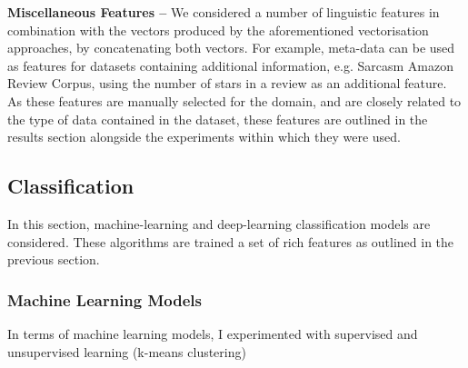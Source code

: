 \documentclass[12pt,a4paper]{article}
\begin{document}
\noindent \textbf{Miscellaneous Features --}
We considered a number of linguistic features in combination with the vectors produced by the aforementioned vectorisation approaches, by concatenating both vectors. For example, meta-data can be used as features for datasets containing additional information, e.g. Sarcasm Amazon Review Corpus, using the number of stars in a review as an additional feature. As these features are manually selected for the domain, and are closely related to the type of data contained in the dataset, these features are outlined in the results section alongside the experiments within which they were used.\\

\subsection{Classification}
\noindent 
In this section, machine-learning and deep-learning classification models are considered. These algorithms are trained a set of rich features as outlined in the previous section.

\subsubsection{Machine Learning Models}
In terms of machine learning models, I experimented with supervised and unsupervised learning (k-means clustering)
\end{document}
